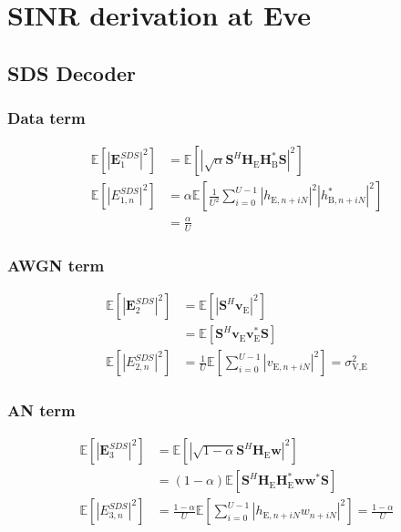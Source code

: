 \documentclass[journal,comsoc]{IEEEtran}
\newcommand{\module}[1]{\left|#1\right|}
\newcommand{\EX}[1]{\mathbb{E} \left[#1\right]}%
\newcommand{\HE}{\textbf{H}_{\text{E}}}
\newcommand{\HB}{\textbf{H}_{\text{B}}}
\newcommand{\ve}{\textbf{v}_{\text{E}}}
\newcommand{\spread}{\textbf{S}}
\newcommand{\w}{\textbf{w}}
\begin{document}
\section{SINR derivation at Eve}\label{sec:at-the-unintended-position-app}
\subsection{SDS Decoder}\label{sec:same-decoding-structure-as-bob-app}
\subsubsection{Data term}\label{sec:data-term-app-1}
\begin{equation}
	\begin{split}
		\EX{|\textbf{E}_{1}^{SDS}|^2} &= \EX{\module{\sqrt{\alpha}\spread^H \HE\HB^* \spread}^2} \\
		\EX{|E_{1,n}^{SDS}|^2}&=\alpha \EX{\frac{1}{U^2} \sum_{i=0}^{U-1} \left| h_{\text{E}, n + iN} \right|^2 \left| h^*_{\text{B}, n + iN}\right|^2 } \\
		&= \frac{\alpha}{U}
	\end{split}
	\label{eq:appA:data_eve_filt0-app}
\end{equation}



\subsubsection{AWGN term}\label{sec:awgn-term-app-1}
\begin{equation}
	\begin{split}
		\EX{|\textbf{E}_{2}^{SDS}|^2} &=  \EX{\module{\spread^H \ve}^2} \\
		&=\EX{\spread^H \ve \ve^* \spread } \\
		\EX{|E_{2,n}^{SDS}|^2} &= \frac{1}{U} \EX{\sum_{i=0}^{U-1} |v_{\text{E}, n + iN}|^2} = \sigma^2_{\text{V,E}}
	\end{split}
	\label{eq:appA:noise_eve_filt0-app}
\end{equation}


\subsubsection{AN term}\label{sec:an-term-app-1}
\begin{equation}
	\begin{split}
		\EX{|\textbf{E}_{3}^{SDS}|^2} &=  \EX{\module{\sqrt{1-\alpha}\spread^H \HE \w}^2} \\
		&=(1-\alpha)\EX{\spread^H \HE\textbf{H}^*_{\text{E}} \w\w^* \spread } \\
		\EX{|E_{3,n}^{SDS}|^2}  &= \frac{1-\alpha}{U} \EX{\sum_{i=0}^{U-1} |h_{\text{E}, n + iN}w_{n + iN}|^2} = \frac{1-\alpha}{U}
	\end{split}
	\label{eq:appA:an_eve_filt0-app}
\end{equation}
\end{document}
